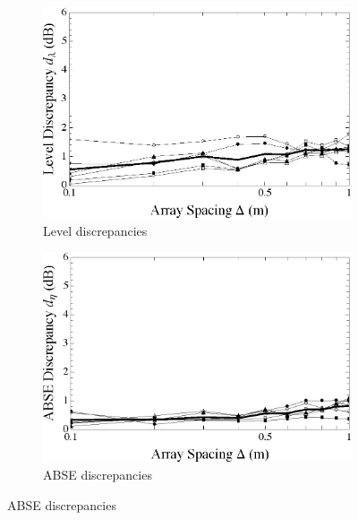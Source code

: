 \begin{figure}[t]
    	\centering
    	\begin{subfigure}[b]{0.49\textwidth}
		\includegraphics[width=\textwidth]{10_experimental_validation/figures/audibleEnergy_fullexp_D.eps}
		\caption{Level discrepancies}
		\label{fig:10_Experimental_Validation:MAE_Delta_Discrepancy}
    	\end{subfigure}
	\hfill
	\begin{subfigure}[b]{0.49\textwidth}
		\includegraphics[width=\textwidth]{10_experimental_validation/figures/scharer2009_fullexp_D.eps}
		\caption{ABSE discrepancies}
		\label{fig:10_Experimental_Validation:ABSE_Delta_Discrepancy}
    	\end{subfigure}
	

\end{figure}
